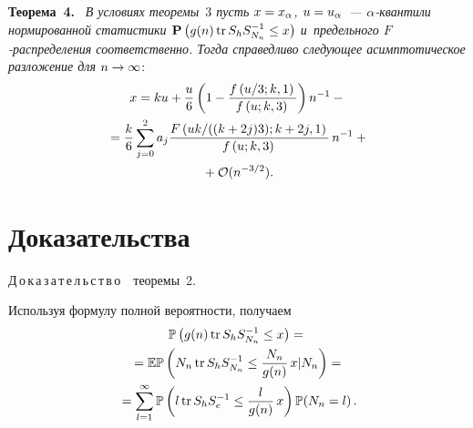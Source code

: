 \begin{multicols}{2}
\noindent
\textbf{Теорема~4.}\
\textit{В условиях теоремы~$3$ пусть $x\hm=x_\alpha$, $u\hm=u_\alpha$~---
 $\alpha$-кван\-ти\-ли нормированной статистики $\mathbf{P}\left( g(n) \,\mathrm{tr}\,S_h S^{-1}_{N_n} 
 \hm\leq x\right)$ и~предельного $F$-рас\-пре\-де\-ле\-ния соответственно.
Тогда справедливо сле\-ду\-ющее асимптотическое разложение для}  $n \hm\to \infty$:
\begin{multline*}
x=ku +  \displaystyle\frac{\displaystyle u\mathstrut}{\displaystyle 6\mathstrut} \left(1-  \displaystyle\frac{\displaystyle f\left( u/3;k,1\right)\mathstrut}{\displaystyle f\left(u;k,3\right)\mathstrut} 
\right)n^{-1} - {}\\
{}=
\displaystyle\frac{\displaystyle k\mathstrut}{\displaystyle 6\mathstrut} \sum\limits_{j=0}^{2} a_j  
\displaystyle\frac{\displaystyle F\left( {uk}/({(k+2j)3});k+2j,1\right)\mathstrut}{\displaystyle f\left(u;k,3\right)\mathstrut}\,n^{-1} + {}\\
{}+ \mathcal{O}(n^{- 3/2}).
\end{multline*}


\section{Доказательства}



\noindent
Д\,о\,к\,а\,з\,а\,т\,е\,л\,ь\,с\,т\,в\,о\ \ тео\-ре\-мы~2.

 Используя формулу полной вероятности, получаем
\begin{multline}
\label{pr1_1}
\mathbb{P} \left( g(n) \,\mathrm{tr} \,S_h S^{-1}_{N_n} \leq x \right) = {}\\
{}=
\mathbb{E}\mathbb{P} \left( N_n \,\textrm{tr}\, S_h S^{-1}_{N_n} \leq 
\displaystyle\frac{\displaystyle N_n\mathstrut}{\displaystyle g(n)\mathstrut}\,x  \vert  N_n \right) = {} \\
{}= \sum\limits_{l=1}^{\infty} \mathbb{P} \left( l \,\mathrm{tr}\,S_h S^{-1}_{e} \leq 
\displaystyle\frac{\displaystyle l\mathstrut}{\displaystyle g(n)\mathstrut}\,x \right)  \mathbb{P}(N_n=l)\,.
 \end{multline}


\end{multicols}
